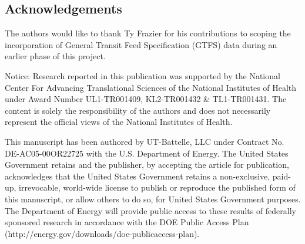 \subsection{Acknowledgements}

The authors would like to thank Ty Frazier for his contributions to scoping the incorporation of General Transit Feed Specification (GTFS) data during an earlier phase of this project.

Notice: Research reported in this publication was supported by the National Center For Advancing Translational Sciences of the National Institutes of Health under Award Number UL1-TR001409, KL2-TR001432 \& TL1-TR001431. The content is solely the responsibility of the authors and does not necessarily represent the official views of the National Institutes of Health.

This manuscript has been authored by UT-Battelle, LLC under Contract No. DE-AC05-00OR22725 with the U.S. Department of Energy. The United States Government retains and the publisher, by accepting the article for publication, acknowledges that the United States Government retains a non-exclusive, paid-up, irrevocable, world-wide license to publish or reproduce the published form of this manuscript, or allow others to do so, for United States Government purposes. The Department of Energy will provide public access to these results of federally sponsored research in accordance with the DOE Public Access Plan (http://energy.gov/downloads/doe-publicaccess-plan).






